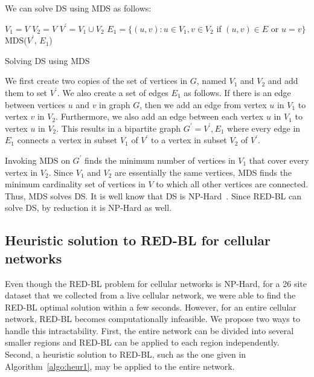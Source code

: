We can solve DS using MDS as follows:
\IncMargin{1em}
\LinesNumbered
\begin{algorithm}
 $V_1 = V$\;
 $V_2 = V$\;
 $V^{\prime} = V_1 \cup V_2$\;
 $E_1 = \{(u, v): u \in V_1, v \in V_2$ if $(u, v) \in E$ or $u = v\}$\;
 MDS($V^{\prime}$, $E_1$)\;
\caption{Solving DS using MDS}
\label{algo:proof}
\end{algorithm}
\DecMargin{1em}

We first create two copies of the set of vertices in $G$, named $V_1$ and $V_2$ and add them to set $V^{\prime}$. We also create a set of edges $E_1$ as follows. If there is an edge between vertices $u$ and $v$ in graph $G$, then we add an edge from vertex $u$ in $V_1$ to vertex $v$ in $V_2$. Furthermore, we also add an edge between each vertex $u$ in $V_1$ to vertex $u$ in $V_2$. This results in a bipartite graph $G^{\prime}={V^{\prime}, E_1}$ where every edge in $E_1$ connects a vertex in subset $V_1$ of $V^{\prime}$ to a vertex in subset $V_2$ of $V^{\prime}$.

Invoking MDS on $G^{\prime}$ finds the minimum number of vertices in $V_1$ that cover every vertex in $V_2$. Since $V_1$ and $V_2$ are essentially the same vertices, MDS finds the minimum cardinality set of vertices in $V$ to which all other vertices are connected. Thus, MDS solves DS. It is well know that DS is NP-Hard~\cite{Liedloff:2008:FDS:1390853.1390871}. Since RED-BL can solve DS, by reduction it is NP-Hard as well.

\subsection{Heuristic solution to RED-BL for cellular networks}
\label{subsec:heuristics} Even though the RED-BL problem for cellular networks is NP-Hard, for a 26 site dataset that we collected from a live cellular network, we were able to find the RED-BL optimal solution within a few seconds.
However, for an entire cellular network, RED-BL becomes computationally infeasible.
We propose two ways to handle this intractability. First, the entire network can be divided into several smaller regions and RED-BL can be applied to each region independently.
Second, a heuristic solution to RED-BL, such as the one given in Algorithm~\ref{algo:heur1}, may be applied to the entire network.

